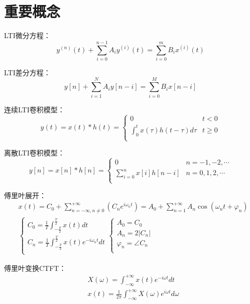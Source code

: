 \chapter{重要概念}

LTI微分方程：
\[
y^{\left( n \right)}\left( t \right) +\sum_{i=0}^{n-1}{A_iy^{\left( i \right)}\left( t \right)}=\sum_{i=0}^m{B_ix^{\left( i \right)}\left( t \right)}
\]

LTI差分方程：
\[
y\left[ n \right] +\sum_{i=1}^N{A_iy\left[ n-i \right]}=\sum_{i=0}^M{B_ix\left[ n-i \right]}
\]

连续LTI卷积模型：
\[
y\left( t \right) =x\left( t \right) \ast h\left( t \right) =\begin{cases}
	0 &t<0\\
	\int_0^t{x\left( \tau \right) h\left( t-\tau \right) d\tau} &t\geqslant 0\\
\end{cases}
\]

离散LTI卷积模型：
\[
y\left[ n \right] =x\left[ n \right] \ast h\left[ n \right] =\begin{cases}
	0 &n=-1,-2,\cdots\\
	\sum_{i=0}^n{x\left[ i \right] h\left[ n-i \right]} &n=0,1,2,\cdots\\
\end{cases}
\]

傅里叶展开：
\begin{align*}
&x\left( t \right) =C_0+\sum_{n=-\infty ,n\ne 0}^{+\infty}{\left( C_ne^{i\omega _nt} \right)}=A_0+\sum_{n=1}^{+\infty}{A_n\cos \left( \omega _nt+\varphi _n \right)} \\
&\begin{cases}
	C_0=\frac{1}{T}\int_{-\frac{T}{2}}^{\frac{T}{2}}{x\left( t \right) dt}\\
	C_n=\frac{1}{T}\int_{-\frac{T}{2}}^{\frac{T}{2}}{x\left( t \right) e^{-i\omega _nt}dt}\\
\end{cases}\begin{cases}
	A_0=C_0\\
	A_n=2\left| C_n \right|\\
	\varphi _n=\angle C_n\\
\end{cases}
\end{align*}

傅里叶变换CTFT：
\begin{align*}
&X\left( \omega \right) =\int_{-\infty}^{+\infty}{x\left( t \right) e^{-i\omega t}dt} \\
&x\left( t \right) =\frac{1}{2\pi}\int_{-\infty}^{+\infty}{X\left( \omega \right) e^{i\omega t}d\omega}
\end{align*}

